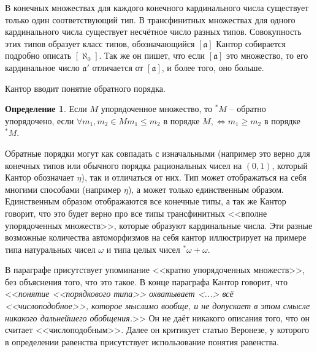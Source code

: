 \documentclass[a4paper,12pt]{extarticle}
\theoremstyle{definition}
\newtheorem{definition}{Определение}
\newcommand{\cit}[1]{<<\textit{#1}>>}
\begin{document}
В конечных множествах для каждого конечного кардинального числа существует только один соответствующий тип.
В трансфинитных множествах для одного кардинального числа существует несчётное число разных типов.
Совокупность этих типов образует класс типов, обозначающийся $[\mathfrak{a}]$
Кантор собирается подробно описать $[\aleph_0]$.
Так же он пишет, что если $[\mathfrak{a}]$ это множество, то его кардинальное число $\mathfrak{a'}$ отличается от $[\mathfrak{a}]$, и более того, оно больше.

Кантор вводит понятие обратного порядка.
\begin{definition}
    Если $M$ упорядоченное множество, то $^*M$ -- обратно упорядочено, если $\forall m_1, m_2 \in M m_1 \leqslant m_2$ в порядке $M, \iff m_1 \geqslant m_2$ в порядке $^*M$.
\end{definition}
Обратные порядки могут как совпадать с изначальными (например это верно для конечных типов или обычного порядка рациональных чисел на $(0, 1)$,
который Кантор обозначает $\eta$), так и отличаться от них.
Тип может отображаться на себя многими способами (например $\eta$), а может только единственным образом.
Единственным образом отображаются все конечные типы, а так же Кантор говорит, что это будет верно про все типы трансфинитных <<вполне упорядоченных множеств>>, которые образуют кардинальные числа.
Эти разные возможные количества автоморфизмов на себя кантор иллюстрирует на примере типа натуральных чисел $\omega$ и типа целых чисел $^*\omega + \omega$.

В параграфе присутствует упоминание <<кратно упорядоченных множеств>>, без объяснения того, что это такое.
В конце параграфа Кантор говорит, что \cit{понятие <<порядкового типа>> охватывает <...> всё <<числоподобное>>, которое мыслимо вообще, и не допускает в этом смысле никакого дальнейшего обобщения.}
Он не даёт никакого описания того, что он считает <<числоподобным>>.
Далее он критикует статью Веронезе, у которого в определении равенства присутствует использование понятия равенства.
\end{document}
